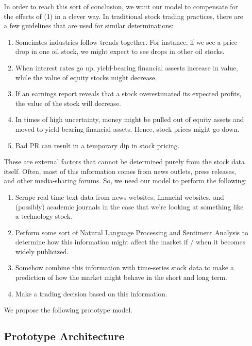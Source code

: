 \documentclass[final]{article}
\begin{document}
In order to reach this sort of conclusion, we want our model to
compensate for the effects of (1) in a clever way. In traditional
stock trading practices, there are a few guidelines that are used for
similar determinations:
\begin{enumerate}
  \item Someimtes industries follow trends together. For instance, if
    we see a price drop in one oil stock, we might expect to see drops
    in other oil stocks.
  \item When interest rates go up, yield-bearing financial assests
    increase in value, while the value of equity stocks might
    decrease.
  \item If an earnings report reveals that a stock overestimated its
    expected profits, the value of the stock will decrease.
  \item In times of high uncertainty, money might be pulled out of
    equity assets and moved to yield-bearing financial assets. Hence,
    stock prices might go down.
  \item Bad PR can result in a temporary dip in stock pricing.
\end{enumerate}

These are external factors that cannot be determined purely from the
stock data itself. Often, most of this information comes from news
outlets, press releases, and other media-sharing forums. So, we need
our model to perform the following:
\begin{enumerate}
  \item Scrape real-time text data from news websites, financial
    websites, and (possibly) academic journals in the case that we're
    looking at something like a technology stock.
  \item Perform some sort of Natural Language Processing and Sentiment
    Analysis to determine how this information might affect the market
    if / when it becomes widely publicized.
  \item Somehow combine this information with time-series stock data
    to make a prediction of how the market might behave in the short
    and long term.
  \item Make a trading decision based on this information.
\end{enumerate}
We propose the following prototype model.

\subsection{Prototype Architecture}
\end{document}
